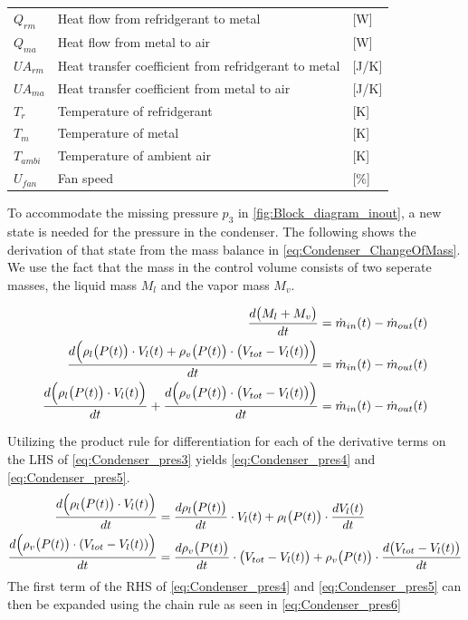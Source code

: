 \begin{center}
	\begin{tabular}{l p{8cm} l}
		$Q_{rm}$				&	Heat flow from refridgerant to metal					& [\si{W}] \\
		$Q_{ma}$				&	Heat flow from metal to air								& [\si{W}] \\
		$U A_{rm}$				& 	Heat transfer coefficient from refridgerant to metal 	& [\si{J}/\si{K}] \\
		$U A_{ma}$				& 	Heat transfer coefficient from metal to air				& [\si{J}/\si{K}] \\
		$T_r$					& 	Temperature of refridgerant 							& [\si{K}] \\
		$T_m$					&	Temperature of metal 									& [\si{K}] \\
		$T_{ambi}$				&	Temperature of ambient air 								& [\si{K}] \\
		$U_{fan}$				&	Fan speed												& [$\%$] \\
	\end{tabular}
\end{center}


To accommodate the missing pressure $ p_3 $ in \cref{fig:Block_diagram_inout}, a new state is needed for the pressure in the condenser. The following shows the derivation of that state from the mass balance in \cref{eq:Condenser_ChangeOfMass}. We use the fact that the mass in the control volume consists of two seperate masses, the liquid mass $ M_l $ and the vapor mass $ M_v $.

\begin{align}
		 		\frac{d \bigl(M_{l} + M_{v}\bigr) }{dt} & = \dot{m}_{in}(t) - \dot{m}_{out}(t) 		\label{eq:Condenser_pres1}\\
		 		\frac{d \Bigl(\rho_{l}\bigl(P(t)\bigr)\cdot V_l(t) + \rho_{v}\bigl(P(t)\bigr)\cdot \bigl(V_{tot} - V_l(t)\bigr)\Bigr) }{dt} & = \dot{m}_{in}(t) - \dot{m}_{out}(t)		\label{eq:Condenser_pres2}\\
		 		\frac{d \Bigl(\rho_{l}\bigl(P(t)\bigr)\cdot V_l(t)\Bigr)}{dt} + \frac{d \Bigl(\rho_{v}\bigl(P(t)\bigr)\cdot \bigl(V_{tot} - V_l(t)\bigr)\Bigr) }{dt} & = \dot{m}_{in}(t) - \dot{m}_{out}(t)		\label{eq:Condenser_pres3}
\end{align}

Utilizing the product rule for differentiation for each of the derivative terms on the LHS of \cref{eq:Condenser_pres3} yields \cref{eq:Condenser_pres4} and \cref{eq:Condenser_pres5}.
\begin{align}
	\frac{d \Bigl(\rho_{l}\bigl(P(t)\bigr)\cdot V_l(t)\Bigr)}{dt}  				& =   \frac{d \rho_{l}\bigl(P(t)\bigr)}{dt} \cdot V_l(t)   +   \rho_{l}\bigl(P(t)\bigr)\cdot\frac{d V_l(t)}{dt} 	\label{eq:Condenser_pres4} \\
	\frac{d \Bigl(\rho_{v}\bigl(P(t)\bigr)\cdot (V_{tot} - V_l(t))\Bigr) }{dt} 	& =  \frac{d \rho_{v}\bigl(P(t)\bigr)}{dt} \cdot \bigl(V_{tot} - V_l(t)\bigr)   +   \rho_{v}\bigl(P(t)\bigr)\cdot\frac{d \bigl(V_{tot} - V_l(t)\bigr)}{dt} 	\label{eq:Condenser_pres5}
\end{align}
The first term of the RHS of \cref{eq:Condenser_pres4} and \cref{eq:Condenser_pres5} can then be expanded using the chain rule as seen in \cref{eq:Condenser_pres6}

